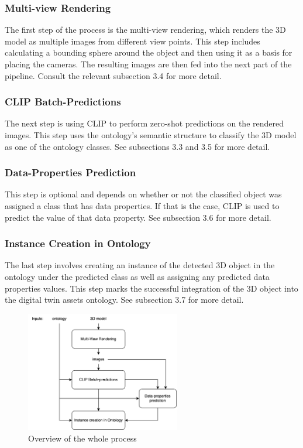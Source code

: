 \documentclass[a4paper,11pt,oneside]{article}
\begin{document}
  \subsubsection{Multi-view Rendering}
  The first step of the process is the multi-view rendering, which renders the 3D model as multiple images from different view points. This step includes calculating a bounding sphere around the object and then using it as a basis for placing the cameras. The resulting images are then fed into the next part of the pipeline. Consult the relevant subsection 3.4 for more detail.
  \subsubsection{CLIP Batch-Predictions}
  The next step is using CLIP to perform zero-shot predictions on the rendered images. This step uses the ontology's semantic structure to classify the 3D model as one of the ontology classes. See subsections 3.3 and 3.5 for more detail.
  \subsubsection{Data-Properties Prediction}
  This step is optional and depends on whether or not the classified object was assigned a class that has data properties. If that is the case, CLIP is used to predict the value of that data property. See subsection 3.6 for more detail.
  \subsubsection{Instance Creation in Ontology}
  The last step involves creating an instance of the detected 3D object in the ontology under the predicted class as well as assigning any predicted data properties values. This step marks the successful integration of the 3D object into the digital twin assets ontology. See subsection 3.7 for more detail.
  \begin{figure}[H]
    \centering
  	\includegraphics[width=0.6\textwidth]{figures/process}
  	\caption{Overview of the whole process}
  	
  	\label{fig:process}
  \end{figure}
  
\end{document}
